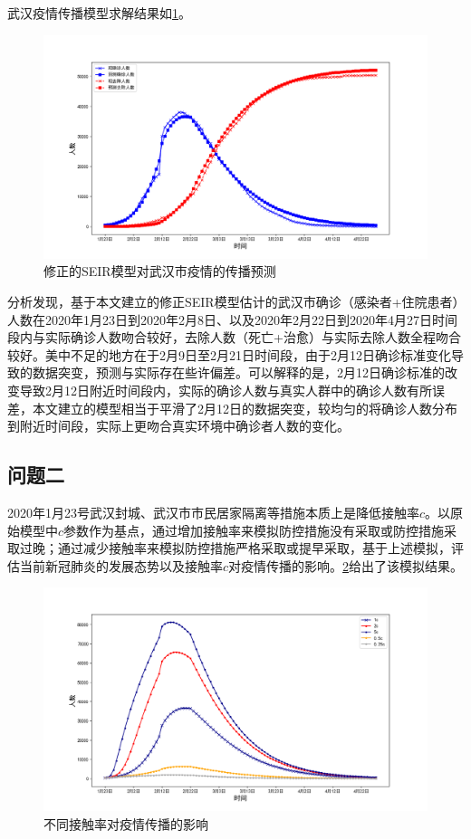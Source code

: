 \documentclass[withoutpre]{cumcmthesis} %
\begin{document}
武汉疫情传播模型求解结果如\cref{fig:model}。
\begin{figure}[!h]
    \centering
    \includegraphics[width=1.0\textwidth]{figures/Model_predict_and_realNum_Graph.png}
    \caption{修正的SEIR模型对武汉市疫情的传播预测}
    \label{fig:model}
\end{figure}

分析发现，基于本文建立的修正SEIR模型估计的武汉市确诊（感染者+住院患者）人数在2020年1月23日到2020年2月8日、以及2020年2月22日到2020年4月27日时间段内与实际确诊人数吻合较好，去除人数（死亡+治愈）与实际去除人数全程吻合较好。美中不足的地方在于2月9日至2月21日时间段，由于2月12日确诊标准变化导致的数据突变，预测与实际存在些许偏差。可以解释的是，2月12日确诊标准的改变导致2月12日附近时间段内，实际的确诊人数与真实人群中的确诊人数有所误差，本文建立的模型相当于平滑了2月12日的数据突变，较均匀的将确诊人数分布到附近时间段，实际上更吻合真实环境中确诊者人数的变化。

\subsection{问题二}
2020年1月23号武汉封城、武汉市市民居家隔离等措施本质上是降低接触率$c$。以原始模型中$c$参数作为基点，通过增加接触率来模拟防控措施没有采取或防控措施采取过晚；通过减少接触率来模拟防控措施严格采取或提早采取，基于上述模拟，评估当前新冠肺炎的发展态势以及接触率$c$对疫情传播的影响。\cref{fig:c}给出了该模拟结果。
\begin{figure}[!h]
    \centering
    \includegraphics[width=1.0\textwidth]{figures/c.png}
    \caption{不同接触率对疫情传播的影响}
    \label{fig:c}
\end{figure}
\end{document}
